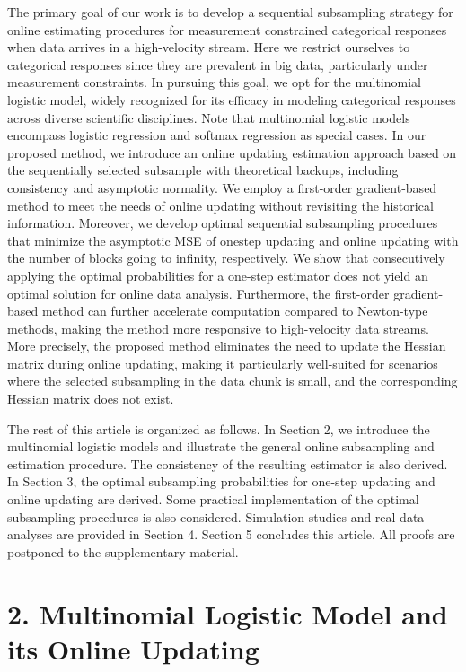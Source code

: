 \documentclass[
  10
]{article}
\begin{document}
The primary goal of our work is to develop a sequential subsampling
strategy for online estimating procedures for measurement constrained
categorical responses when data arrives in a high-velocity stream. Here
we restrict ourselves to categorical responses since they are prevalent
in big data, particularly under measurement constraints. In pursuing
this goal, we opt for the multinomial logistic model, widely recognized
for its efficacy in modeling categorical responses across diverse
scientific disciplines. Note that multinomial logistic models encompass
logistic regression and softmax regression as special cases. In our
proposed method, we introduce an online updating estimation approach
based on the sequentially selected subsample with theoretical backups,
including consistency and asymptotic normality. We employ a first-order
gradient-based method to meet the needs of online updating without
revisiting the historical information. Moreover, we develop optimal
sequential subsampling procedures that minimize the asymptotic MSE of
onestep updating and online updating with the number of blocks going to
infinity, respectively. We show that consecutively applying the optimal
probabilities for a one-step estimator does not yield an optimal
solution for online data analysis. Furthermore, the first-order
gradient-based method can further accelerate computation compared to
Newton-type methods, making the method more responsive to high-velocity
data streams. More precisely, the proposed method eliminates the need to
update the Hessian matrix during online updating, making it particularly
well-suited for scenarios where the selected subsampling in the data
chunk is small, and the corresponding Hessian matrix does not exist.

The rest of this article is organized as follows. In Section 2, we
introduce the multinomial logistic models and illustrate the general
online subsampling and estimation procedure. The consistency of the
resulting estimator is also derived. In Section 3, the optimal
subsampling probabilities for one-step updating and online updating are
derived. Some practical implementation of the optimal subsampling
procedures is also considered. Simulation studies and real data analyses
are provided in Section 4. Section 5 concludes this article. All proofs
are postponed to the supplementary material.

\section{2. Multinomial Logistic Model and its Online
Updating}\label{multinomial-logistic-model-and-its-online-updating}
\end{document}
